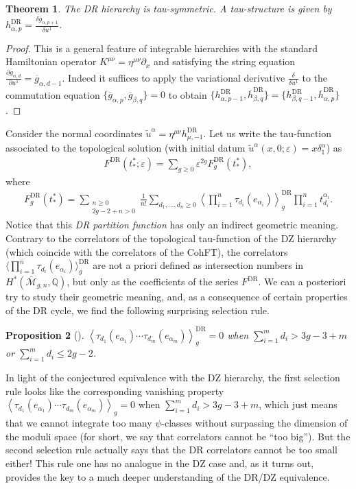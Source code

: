 \documentclass[pdftex]{sigma}
\numberwithin{equation}{section}
\newtheorem{Theorem}{Theorem}[section]
\newtheorem{Proposition}[Theorem]{Proposition}
 { \theoremstyle{definition}
\newtheorem{Remark}[Theorem]{Remark} }
\newcommand{\oM}{\overline{\mathcal M}}
\newcommand{\og}{\overline g}
\newcommand{\oh}{\overline h}
\def\mbQ{{\mathbb Q}}
\def\d{{\partial}}
\newcommand{\<}{\left<}
\renewcommand{\>}{\right>}
\newcommand{\eps}{\varepsilon}
\newcommand{\DR}{\mathrm{DR}}
\begin{document}
\begin{Theorem}
The DR hierarchy is tau-symmetric. A tau-structure is given by
$h^\DR_{\alpha,p} = \frac{\delta \og_{\alpha,p+1}}{\delta u^1}$.
\end{Theorem}
\begin{proof}
This is a general feature of integrable hierarchies with the standard Hamiltonian ope\-ra\-tor $K^{\mu\nu} = \eta^{\mu\nu} \d_x$ and satisfying the string equation $\frac{\d \og_{\alpha,d}}{\d u^1} = \og_{\alpha,d-1}$. Indeed it suf\/f\/ices to apply the variational derivative $\frac{\delta}{\delta u^1}$ to the commutation equation $\{\og_{\alpha,p},\og_{\beta,q}\}=0$ to obtain $\big\{h^\DR_{\alpha,p-1},\oh^\DR_{\beta,q}\big\} = \big\{h^\DR_{\beta,q-1},\oh^\DR_{\alpha,p}\big\}$.
\end{proof}
Consider the normal coordinates $\widetilde{u}^\alpha = \eta^{\mu\nu} h^\DR_{\mu,-1}$. Let us write the tau-function associated to the topological solution (with initial datum $\widetilde{u}^\alpha(x,0;\eps) = x \delta^\alpha_1$) as
\begin{gather*} F^{\DR}(t^*_*;\eps)= \sum_{g\ge 0}\eps^{2g}F^{\DR}_g(t^*_*),
\end{gather*}
where
\begin{gather*}
F_g^\DR(t^*_*)=\sum_{\substack{n\ge 0\\2g-2+n>0}}\frac{1}{n!}\sum_{d_1,\dots,d_n\ge 0}\<\prod_{i=1}^n\tau_{d_i}(e_{\alpha_i})\>_g^{\DR}\prod_{i=1}^nt^{\alpha_i}_{d_i}.
\end{gather*}
Notice that this \emph{DR partition function} has only an indirect geometric meaning. Contrary to the correlators of the topological tau-function of the DZ hierarchy (which coincide with the correlators of the CohFT), the correlators $\Big\langle\prod\limits_{i=1}^n\tau_{d_i}(e_{\alpha_i})\Big\rangle_g^{\DR}$ are not a priori def\/ined as intersection numbers in $H^*(\oM_{g,n},\mbQ)$, but only as the coef\/f\/icients of the series $F^{\DR}$. We can a posteriori try to study their geometric meaning, and, as a consequence of certain properties of the DR cycle, we f\/ind the following surprising selection rule.
\begin{Proposition}[\cite{BDGR16a}]\label{prop:selection rule}
$\<\tau_{d_1}(e_{\alpha_1})\cdots\tau_{d_m}(e_{\alpha_m})\>^{\DR}_g=0$ when $\sum\limits_{i=1}^m d_i> 3g - 3 + m $ or $\sum\limits_{i=1}^m d_i \leq 2g-2$.
\end{Proposition}
In light of the conjectured equivalence with the DZ hierarchy, the f\/irst selection rule looks like the corresponding vanishing property $\<\tau_{d_1}(e_{\alpha_1})\cdots\tau_{d_m}(e_{\alpha_m})\>_g=0$ when $\sum\limits_{i=1}^m d_i> 3g - 3 + m $, which just means that we cannot integrate too many $\psi$-classes without surpassing the dimension of the moduli space (for short, we say that correlators cannot be ``too big''). But the second selection rule actually says that the DR correlators cannot be too small either! This rule one has no analogue in the DZ case and, as it turns out, provides the key to a much deeper understanding of the DR/DZ equivalence.
\end{document}

